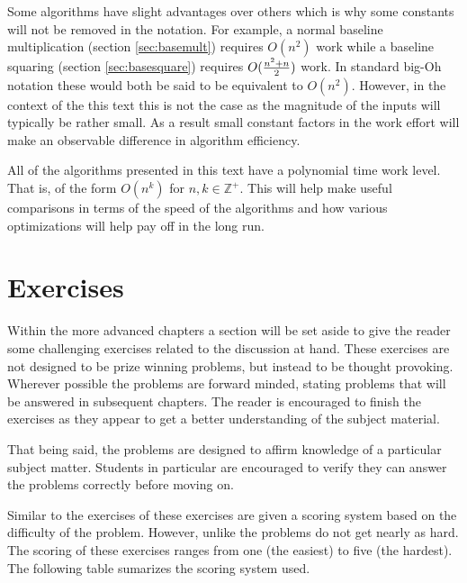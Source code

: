 \documentclass[b5paper]{book}
\def\Z{{\mathbb Z}}
\begin{document}
Some algorithms have slight advantages over others which is why some constants will not be removed in 
the notation.  For example, a normal baseline multiplication (section \ref{sec:basemult}) requires $O(n^2)$ work while a 
baseline squaring (section \ref{sec:basesquare}) requires $O({{n^2 + n}\over 2})$ work.  In standard big-Oh notation these 
would both be said to be equivalent to $O(n^2)$.  However, 
in the context of the this text this is not the case as the magnitude of the inputs will typically be rather small.  As a 
result small constant factors in the work effort will make an observable difference in algorithm efficiency.

All of the algorithms presented in this text have a polynomial time work level.  That is, of the form 
$O(n^k)$ for $n, k \in \Z^{+}$.  This will help make useful comparisons in terms of the speed of the algorithms and how 
various optimizations will help pay off in the long run.

\section{Exercises}
Within the more advanced chapters a section will be set aside to give the reader some challenging exercises related to
the discussion at hand.  These exercises are not designed to be prize winning problems, but instead to be thought 
provoking.  Wherever possible the problems are forward minded, stating problems that will be answered in subsequent 
chapters.  The reader is encouraged to finish the exercises as they appear to get a better understanding of the 
subject material.  

That being said, the problems are designed to affirm knowledge of a particular subject matter.  Students in particular
are encouraged to verify they can answer the problems correctly before moving on.

Similar to the exercises of \cite[pp. ix]{TAOCPV2} these exercises are given a scoring system based on the difficulty of
the problem.  However, unlike \cite{TAOCPV2} the problems do not get nearly as hard.  The scoring of these 
exercises ranges from one (the easiest) to five (the hardest).  The following table sumarizes the 
scoring system used.
\end{document}
